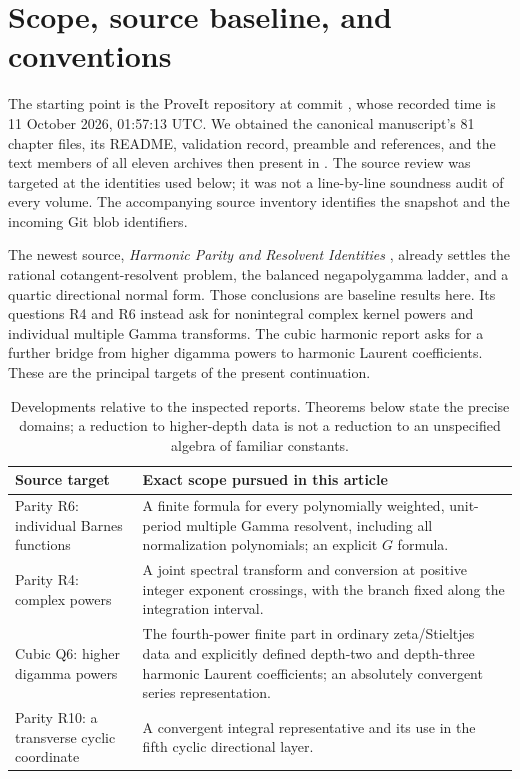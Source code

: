 \section{Scope, source baseline, and conventions}
\label{bhr:sec:scope}

The starting point is the ProveIt repository at commit
\snapshot, whose recorded time is 11 October 2026, 01:57:13 UTC.
We obtained the canonical manuscript's 81 chapter files, its README,
validation record, preamble and references, and the text members of all
eleven archives then present in . The source review
was targeted at the identities used below; it was not a line-by-line
soundness audit of every volume. The accompanying source inventory
identifies the snapshot and the incoming Git blob identifiers.

The newest source, \emph{Harmonic Parity and Resolvent Identities}
\cite{bhr:Parity}, already settles the rational cotangent-resolvent
problem, the balanced negapolygamma ladder, and a quartic directional
normal form. Those conclusions are baseline results here. Its
questions R4 and R6 instead ask for nonintegral complex kernel powers
and individual multiple Gamma transforms. The cubic harmonic report
\cite{bhr:Cubic} asks for a further bridge from higher digamma powers to
harmonic Laurent coefficients. These are the principal targets of
the present continuation.

\begin{table}[htbp]
\small
\begin{tabularx}{\textwidth}{@{}>{\raggedright\arraybackslash}p{}Y@{}}
\toprule
Source target & Exact scope pursued in this article\\
\midrule
Parity R6: individual Barnes functions & A finite formula for every
polynomially weighted, unit-period multiple Gamma resolvent, including
all normalization polynomials; an explicit $G$ formula.\\[5pt]
Parity R4: complex powers & A joint spectral transform and conversion
at positive integer exponent crossings, with the branch fixed along
the integration interval.\\[5pt]
Cubic Q6: higher digamma powers & The fourth-power finite part in
ordinary zeta/Stieltjes data and explicitly defined depth-two and
depth-three harmonic Laurent coefficients; an absolutely convergent
series representation.\\[5pt]
Parity R10: a transverse cyclic coordinate & A convergent integral
representative and its use in the fifth cyclic directional layer.\\
\bottomrule
\end{tabularx}
\caption{Developments relative to the inspected reports. Theorems below
state the precise domains; a reduction to higher-depth data is not a
reduction to an unspecified algebra of familiar constants.}
\label{bhr:tab:targets}
\end{table}

